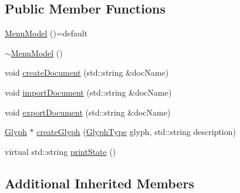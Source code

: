 \subsection*{Public Member Functions}
\begin{DoxyCompactItemize}
\item 
\hyperlink{classMenuModel_aed6e639866f25ae4ab388302cf51ac77}{Menu\-Model} ()=default
\item 
\hyperlink{classMenuModel_a302ddb32e707719e85d559979f0b5d97}{$\sim$\-Menu\-Model} ()
\item 
void \hyperlink{classMenuModel_ad9b8d1e30f024c6a2283d1c91822bdd2}{create\-Document} (std\-::string \&doc\-Name)
\item 
void \hyperlink{classMenuModel_a95f08e56638248ef87aecd4d562ba44b}{import\-Document} (std\-::string \&doc\-Name)
\item 
void \hyperlink{classMenuModel_a3533d1ef3d28bb399e9e276b9aa81007}{export\-Document} (std\-::string \&doc\-Name)
\item 
\hyperlink{classGlyph}{Glyph} $\ast$ \hyperlink{classMenuModel_a73a5b58296b95f8ee55fc6581f5a3002}{create\-Glyph} (\hyperlink{gliph_8h_a84dea1dd1afdc2f1990fe2b14d971b6e}{Glyph\-Type} glyph, std\-::string description)
\item 
virtual std\-::string \hyperlink{classMenuModel_ab49130e41f188e5c632c4681961d9415}{print\-State} ()
\end{DoxyCompactItemize}
\subsection*{Additional Inherited Members}


